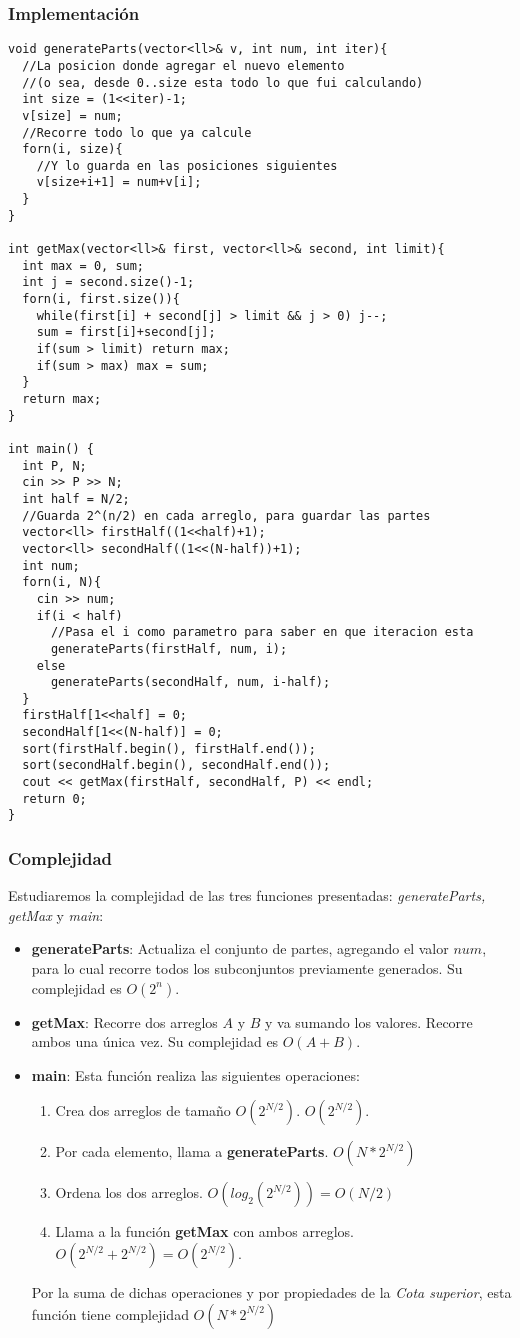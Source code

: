 \subsubsection{Implementación}
\begin{verbatim}
void generateParts(vector<ll>& v, int num, int iter){
  //La posicion donde agregar el nuevo elemento
  //(o sea, desde 0..size esta todo lo que fui calculando)
  int size = (1<<iter)-1;
  v[size] = num;
  //Recorre todo lo que ya calcule
  forn(i, size){
    //Y lo guarda en las posiciones siguientes
    v[size+i+1] = num+v[i];
  }
}

int getMax(vector<ll>& first, vector<ll>& second, int limit){
  int max = 0, sum;
  int j = second.size()-1;
  forn(i, first.size()){
    while(first[i] + second[j] > limit && j > 0) j--;
    sum = first[i]+second[j];
    if(sum > limit) return max;
    if(sum > max) max = sum;
  }
  return max;
}

int main() {
  int P, N;
  cin >> P >> N;
  int half = N/2;
  //Guarda 2^(n/2) en cada arreglo, para guardar las partes
  vector<ll> firstHalf((1<<half)+1);
  vector<ll> secondHalf((1<<(N-half))+1);
  int num;
  forn(i, N){
    cin >> num;
    if(i < half)
      //Pasa el i como parametro para saber en que iteracion esta
      generateParts(firstHalf, num, i);
    else
      generateParts(secondHalf, num, i-half);
  }
  firstHalf[1<<half] = 0;
  secondHalf[1<<(N-half)] = 0;
  sort(firstHalf.begin(), firstHalf.end());
  sort(secondHalf.begin(), secondHalf.end());
  cout << getMax(firstHalf, secondHalf, P) << endl;
  return 0;
}
\end{verbatim}

\subsubsection{Complejidad}
Estudiaremos la complejidad de las tres funciones presentadas: \emph{generateParts, getMax} y \emph{main}:
\begin{itemize}
	\item \textbf{generateParts}: Actualiza el conjunto de partes, agregando el valor $num$, para lo cual recorre todos los subconjuntos previamente generados. Su complejidad es $O(2^n)$.
	\item \textbf{getMax}: Recorre dos arreglos $A$ y $B$ y va sumando los valores. Recorre ambos una única vez. Su complejidad es $O(A+B)$.
	\item \textbf{main}: Esta función realiza las siguientes operaciones:
	\begin{enumerate}
		\item Crea dos arreglos de tamaño $O(2^{N/2})$. $O(2^{N/2})$.
		\item Por cada elemento, llama a \textbf{generateParts}. $O(N*2^{N/2})$
		\item Ordena los dos arreglos. $O(log_{2}(2^{N/2})) = O(N/2)$
		\item Llama a la función \textbf{getMax} con ambos arreglos. $O(2^{N/2} + 2^{N/2}) = O(2^{N/2})$.
	\end{enumerate}
	Por la suma de dichas operaciones y por propiedades de la \emph{Cota superior}, esta función tiene complejidad $O(N*2^{N/2})$
\end{itemize}